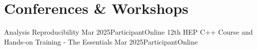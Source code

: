 \documentclass[letterpaper,11pt]{article}
\begin{document}

      
      
      
      



\section{Conferences \& Workshops}
\resumeSubHeadingListStart
      \resumeSubheading
      {Analysis Reproducibility}
      {Mar 2025}{Participant}{Online}
      \resumeSubheading
      {12th HEP C++ Course and Hands-on Training - The Essentials}
      {Mar 2025}{Participant}{Online}
      
\end{document}
